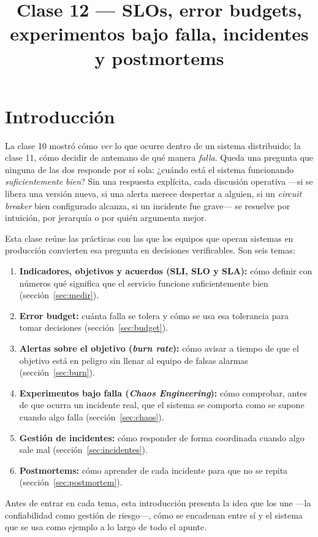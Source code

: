 \documentclass[variant=apuntes,cover=institutional,mode=screen]{ua-engineering-v6-article}
\title{Clase 12 --- SLOs, error budgets, experimentos bajo falla, incidentes y postmortems}
\author{\UAProfessor}
\date{\UADate}
\begin{document}
\sloppy
\maketitle

\section{Introducción}\label{sec:intro}

La clase 10 mostró cómo \emph{ver} lo que ocurre dentro de un sistema distribuido; la clase 11, cómo decidir de antemano de qué manera \emph{falla}. Queda una pregunta que ninguna de las dos responde por sí sola: ¿cuándo está el sistema funcionando \emph{suficientemente bien}? Sin una respuesta explícita, cada discusión operativa ---si se libera una versión nueva, si una alerta merece despertar a alguien, si un \emph{circuit breaker} bien configurado alcanza, si un incidente fue grave--- se resuelve por intuición, por jerarquía o por quién argumenta mejor.

Esta clase reúne las prácticas con las que los equipos que operan sistemas en producción convierten esa pregunta en decisiones verificables. Son seis temas:
\begin{enumerate}
\item \textbf{Indicadores, objetivos y acuerdos (SLI, SLO y SLA):} cómo definir con números qué significa que el servicio funcione suficientemente bien (sección~\ref{sec:medir}).
\item \textbf{Error budget:} cuánta falla se tolera y cómo se usa esa tolerancia para tomar decisiones (sección~\ref{sec:budget}).
\item \textbf{Alertas sobre el objetivo (\emph{burn rate}):} cómo avisar a tiempo de que el objetivo está en peligro sin llenar al equipo de falsas alarmas (sección~\ref{sec:burn}).
\item \textbf{Experimentos bajo falla (\emph{Chaos Engineering}):} cómo comprobar, antes de que ocurra un incidente real, que el sistema se comporta como se supone cuando algo falla (sección~\ref{sec:chaos}).
\item \textbf{Gestión de incidentes:} cómo responder de forma coordinada cuando algo sale mal (sección~\ref{sec:incidentes}).
\item \textbf{Postmortems:} cómo aprender de cada incidente para que no se repita (sección~\ref{sec:postmortem}).
\end{enumerate}

Antes de entrar en cada tema, esta introducción presenta la idea que los une ---la confiabilidad como gestión de riesgo---, cómo se encadenan entre sí y el sistema que se usa como ejemplo a lo largo de todo el apunte.
\end{document}
